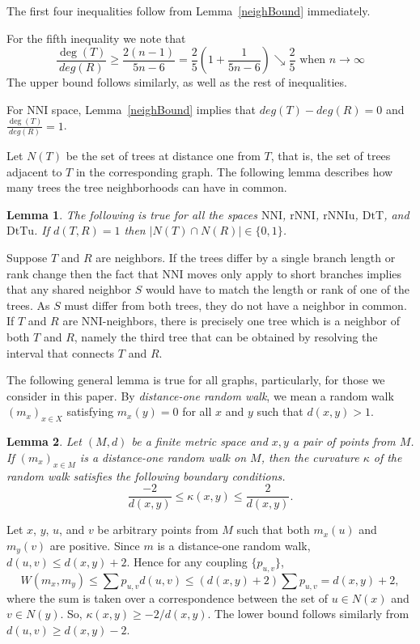 \documentclass{amsart}
\newtheorem{lemma}{Lemma}
\theoremstyle{definition}
\newcommand{\nni}{\mathrm{NNI}}
\newcommand{\rnni}{\mathrm{rNNI}}
\newcommand{\rnniu}{\mathrm{rNNIu}}
\newcommand{\mdts}{\mathrm{DtT}}
\newcommand{\mdtsu}{\mathrm{DtTu}}
\begin{document}
\proof
The first four inequalities follow from Lemma~\ref{neighBound} immediately.

For the fifth inequality we note that
\[
\frac{\deg(T)}{deg(R)} \geq \frac{2(n-1)}{5n-6} = \frac25 \left(1 + \frac{1}{5n-6}\right) \searrow \frac 25 \mbox{ when } n\to\infty
\]
The upper bound follows similarly, as well as the rest of inequalities.
\endproof

For $\nni$ space, Lemma~\ref{neighBound} implies that $deg(T)-deg(R) = 0$ and $\frac{\deg(T)}{deg(R)} = 1$.

Let $N(T)$ be the set of trees at distance one from $T$, that is, the set of trees adjacent to $T$ in the corresponding graph.
The following lemma describes how many trees the tree neighborhoods can have in common.

\begin{lemma}\label{intersecNeighb}
The following is true for all the spaces $\nni$, $\rnni$, $\rnniu$, $\mdts$, and $\mdtsu$.
If $d(T,R) = 1$ then $|N(T)\cap N(R)|\in\{0,1\}$.
\end{lemma}

\proof
Suppose $T$ and $R$ are neighbors.
If the trees differ by a single branch length or rank change then the fact that NNI moves only apply to short branches implies that any shared neighbor $S$ would have to match the length or rank of one of the trees.
As $S$ must differ from both trees, they do not have a neighbor in common.
If $T$ and $R$ are NNI-neighbors, there is precisely one tree which is a neighbor of both $T$ and $R$, namely the third tree that can be obtained by resolving the interval that connects $T$ and $R$.
\endproof

The following general lemma is true for all graphs, particularly, for those we consider in this paper.
By {\em distance-one random walk}, we mean a random walk $(m_x)_{x \in X}$ satisfying $m_x(y) = 0$ for all $x$ and $y$ such that $d(x,y) > 1$.

\begin{lemma}\label{curvBoundGeneral}
Let $(M,d)$ be a finite metric space and $x,y$ a pair of points from $M$.
If $(m_x)_{x \in M}$ is a distance-one random walk on $M$, then the curvature $\kappa$ of the random walk satisfies the following boundary conditions.
\[
\dfrac{-2}{d(x,y)} \leq \kappa(x,y) \leq \dfrac{2}{d(x,y)}.
\]
\end{lemma}

\proof
Let $x$, $y$, $u$, and $v$ be arbitrary points from $M$ such that both $m_x(u)$ and $m_y(v)$ are positive.
Since $m$ is a distance-one random walk, $d(u,v) \leq d(x,y) + 2$.
Hence for any coupling $\{p_{u,v}\}$,
\[
W(m_x,m_y) \leq \sum p_{u,v} d(u,v) \leq (d(x,y)+2)\sum p_{u,v} = d(x,y) + 2,
\]
where the sum is taken over a correspondence between the set of $u \in N(x)$ and $v \in N(y)$.
So, $\kappa(x,y) \geq - 2/d(x,y)$.
The lower bound follows similarly from $d(u,v) \geq d(x,y) - 2$.
\endproof
\end{document}
